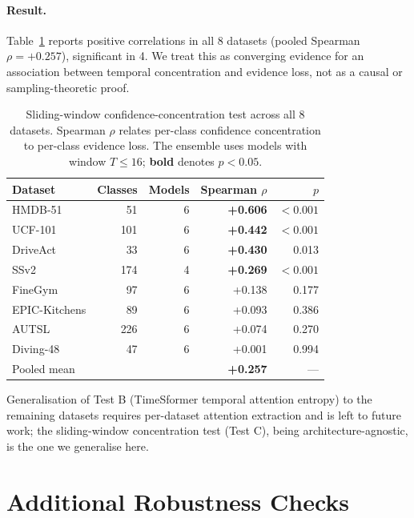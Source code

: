 \documentclass[runningheads]{llncs}
\newcommand{\tabtight}{\setlength{\tabcolsep}{3.5pt}\renewcommand{\arraystretch}{1.12}}
\newcommand{\rev}[1]{\textcolor{revblue}{#1}}
\newcommand{\revdel}[1]{}
\begin{document}
\paragraph{Result.} Table~\ref{tab:sw_ensemble} reports positive correlations in all 8 datasets (pooled Spearman $\rho=+0.257$), significant in 4. \rev{We treat this as converging evidence for an association between temporal concentration and evidence loss, not as a causal or sampling-theoretic proof.}

\begin{table}[!htbp]
\centering
\caption{Sliding-window confidence-concentration test across all 8 datasets. Spearman $\rho$ relates per-class confidence concentration to per-class \rev{evidence loss}\revdel{aliasing loss}. The ensemble uses models with window $T\le16$; \textbf{bold} denotes $p<0.05$.}
\label{tab:sw_ensemble}
\scriptsize\tabtight
\begin{tabular}{l r r r r}
\toprule
Dataset & Classes & Models & Spearman $\rho$ & $p$ \\
\midrule
HMDB-51       &  51 & 6 & \textbf{+0.606} & ${<}0.001$ \\
UCF-101       & 101 & 6 & \textbf{+0.442} & ${<}0.001$ \\
DriveAct      &  33 & 6 & \textbf{+0.430} & 0.013 \\
SSv2          & 174 & 4 & \textbf{+0.269} & ${<}0.001$ \\
FineGym       &  97 & 6 & +0.138 & 0.177 \\
EPIC-Kitchens &  89 & 6 & +0.093 & 0.386 \\
AUTSL         & 226 & 6 & +0.074 & 0.270 \\
Diving-48     &  47 & 6 & +0.001 & 0.994 \\
\midrule
Pooled mean   &     &   & \textbf{+0.257} & --- \\
\bottomrule
\end{tabular}
\end{table}

Generalisation of Test B (TimeSformer temporal attention entropy) to the remaining datasets requires per-dataset attention extraction and is left to future work; the sliding-window concentration test (Test C), being architecture-agnostic, is the one we generalise here.

\section{Additional Robustness Checks}
\label{sec:sup_extra_checks}
\end{document}
